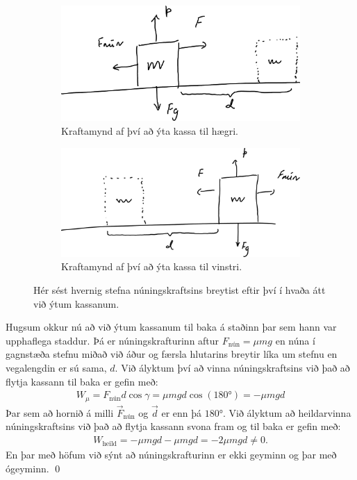 \ifdefined \wholebook \else\documentclass[oneside]{book}\usepackage{EdlBook}\graphicspath{{figures/}}
\begin{document}
\begin{figure}[H]
    \centering
\begin{subfigure}[h]{.45\textwidth}
    \centering
    \includegraphics[width=\linewidth]{temp/worknun2.pdf}
    \caption{Kraftamynd af því að ýta kassa til hægri.}
    \label{fig:nunright}
\end{subfigure}
\hfill
\begin{subfigure}[h]{.45\textwidth}
    \centering
    \includegraphics[width=\linewidth]{temp/worknun.pdf}
    \caption{Kraftamynd af því að ýta kassa til vinstri.}
    \label{fig:nunleft}
\end{subfigure}
\caption{Hér sést hvernig stefna núningskraftsins breytist eftir því í hvaða átt við ýtum kassanum.}
\end{figure}

Hugsum okkur nú að við ýtum kassanum til baka á staðinn þar sem hann var upphaflega staddur. Þá er núningskrafturinn aftur $F_{\text{nún}} = \mu mg$ en núna í gagnstæða stefnu miðað við áður og færsla hlutarins breytir líka um stefnu en vegalengdin er sú sama, $d$. Við ályktum því að vinna núningskraftsins við það að flytja kassann til baka er gefin með:
\begin{align*}
    W_\mu = F_{\text{nún}} d \cos\gamma = \mu mg d \cos(\ang{180}) = -\mu mg d
\end{align*}
Þar sem að hornið á milli $\vec{F}_{\text{nún}}$ og $\vec{d}$ er enn þá $\ang{180}$. Við ályktum að heildarvinna núningskraftsins við það að flytja kassann svona fram og til baka er gefin með:
\begin{align*}
    W_{\text{heild}} = -\mu mgd  - \mu mgd = -2\mu mgd \neq 0.
\end{align*}
En þar með höfum við sýnt að núningskrafturinn er ekki geyminn og þar með ógeyminn. \qed
\end{document}
